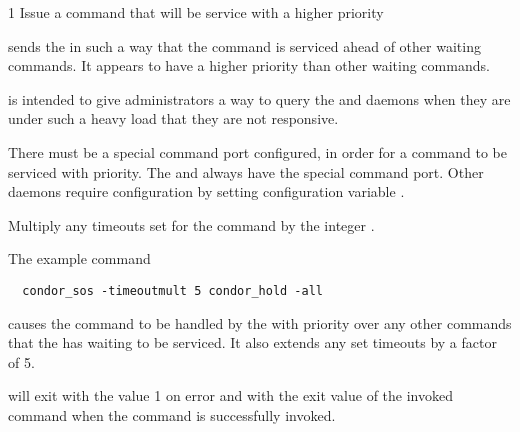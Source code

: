 \begin{ManPage}{\label{man-condor-sos}}{1}
{Issue a command that will be service with a higher priority}

\Synopsis {}
\ToolArgsBase


\Description
{} sends the  in such a way 
that the command is serviced ahead of other waiting commands.
It appears to have a higher priority than other waiting commands.

 is intended to give administrators a way to query the
 and  daemons when they are under
such a heavy load that they are not responsive. 

There must be a special command port configured, 
in order for a command to be serviced with priority.
The  and  always have the special
command port.
Other daemons require configuration by setting
configuration variable .

\begin{Options}
  \ToolArgsBaseDesc
    {Multiply any timeouts set for the command by the integer .  }
\end{Options}

\Examples

The example command
\begin{verbatim}
  condor_sos -timeoutmult 5 condor_hold -all
\end{verbatim}
causes the  command to be handled by the
 with priority over any other commands that the 
has waiting to be serviced.
It also extends any set timeouts by a factor of 5.

\ExitStatus

 will exit with the value 1 on error and with the
exit value of the invoked command when the command is successfully
invoked. 

\end{ManPage}
